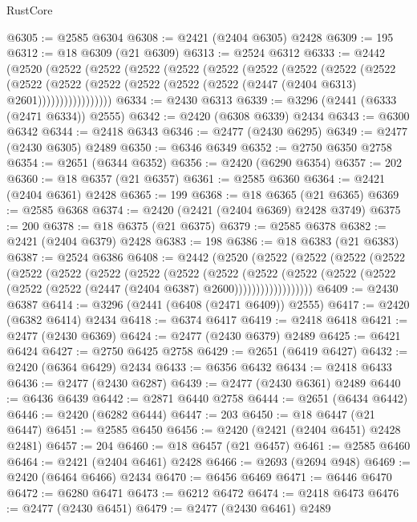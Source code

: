 \begin{lexlean}{RustCore}
\begin{coremodule}
@6305 := @2585 @6304
@6308 := @2421 (@2404 @6305) @2428
@6309 := 195
@6312 := @18 @6309 (@21 @6309)
@6313 := @2524 @6312
@6333 := @2442
    (@2520
      (@2522
        (@2522
          (@2522
            (@2522
              (@2522
                (@2522
                  (@2522
                    (@2522
                      (@2522
                        (@2522
                          (@2522
                            (@2522 (@2522 (@2522 (@2522 (@2447 (@2404 @6313) @2601)))))))))))))))))
@6334 := @2430 @6313
@6339 := @3296 (@2441 (@6333 (@2471 @6334)) @2555)
@6342 := @2420 (@6308 @6339) @2434
@6343 := @6300 @6342
@6344 := @2418 @6343
@6346 := @2477 (@2430 @6295)
@6349 := @2477 (@2430 @6305) @2489
@6350 := @6346 @6349
@6352 := @2750 @6350 @2758
@6354 := @2651 (@6344 @6352)
@6356 := @2420 (@6290 @6354)
@6357 := 202
@6360 := @18 @6357 (@21 @6357)
@6361 := @2585 @6360
@6364 := @2421 (@2404 @6361) @2428
@6365 := 199
@6368 := @18 @6365 (@21 @6365)
@6369 := @2585 @6368
@6374 := @2420 (@2421 (@2404 @6369) @2428 @3749)
@6375 := 200
@6378 := @18 @6375 (@21 @6375)
@6379 := @2585 @6378
@6382 := @2421 (@2404 @6379) @2428
@6383 := 198
@6386 := @18 @6383 (@21 @6383)
@6387 := @2524 @6386
@6408 := @2442
    (@2520
      (@2522
        (@2522
          (@2522
            (@2522
              (@2522
                (@2522
                  (@2522
                    (@2522
                      (@2522
                        (@2522
                          (@2522
                            (@2522
                              (@2522
                                (@2522 (@2522 (@2522 (@2447 (@2404 @6387) @2600))))))))))))))))))
@6409 := @2430 @6387
@6414 := @3296 (@2441 (@6408 (@2471 @6409)) @2555)
@6417 := @2420 (@6382 @6414) @2434
@6418 := @6374 @6417
@6419 := @2418 @6418
@6421 := @2477 (@2430 @6369)
@6424 := @2477 (@2430 @6379) @2489
@6425 := @6421 @6424
@6427 := @2750 @6425 @2758
@6429 := @2651 (@6419 @6427)
@6432 := @2420 (@6364 @6429) @2434
@6433 := @6356 @6432
@6434 := @2418 @6433
@6436 := @2477 (@2430 @6287)
@6439 := @2477 (@2430 @6361) @2489
@6440 := @6436 @6439
@6442 := @2871 @6440 @2758
@6444 := @2651 (@6434 @6442)
@6446 := @2420 (@6282 @6444)
@6447 := 203
@6450 := @18 @6447 (@21 @6447)
@6451 := @2585 @6450
@6456 := @2420 (@2421 (@2404 @6451) @2428 @2481)
@6457 := 204
@6460 := @18 @6457 (@21 @6457)
@6461 := @2585 @6460
@6464 := @2421 (@2404 @6461) @2428
@6466 := @2693 (@2694 @948)
@6469 := @2420 (@6464 @6466) @2434
@6470 := @6456 @6469
@6471 := @6446 @6470
@6472 := @6280 @6471
@6473 := @6212 @6472
@6474 := @2418 @6473
@6476 := @2477 (@2430 @6451)
@6479 := @2477 (@2430 @6461) @2489

\end{coremodule}
\end{lexlean}
